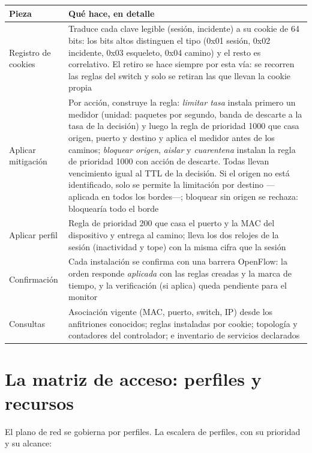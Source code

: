 \documentclass[11pt,a4paper]{article}
\begin{document}
\begin{longtable}{p{4.6cm}p{9.4cm}}
\toprule
\textbf{Pieza} & \textbf{Qué hace, en detalle}\\
\midrule
Registro de cookies & Traduce cada clave legible (sesión, incidente) a su cookie de 64 bits: los bits altos distinguen el tipo (0x01 sesión, 0x02 incidente, 0x03 esqueleto, 0x04 camino) y el resto es correlativo. El retiro se hace siempre por esta vía: se recorren las reglas del switch y solo se retiran las que llevan la cookie propia\\
Aplicar mitigación & Por acción, construye la regla: \emph{limitar tasa} instala primero un medidor (unidad: paquetes por segundo, banda de descarte a la tasa de la decisión) y luego la regla de prioridad 1000 que casa origen, puerto y destino y aplica el medidor antes de los caminos; \emph{bloquear origen}, \emph{aislar} y \emph{cuarentena} instalan la regla de prioridad 1000 con acción de descarte. Todas llevan vencimiento igual al TTL de la decisión. Si el origen no está identificado, solo se permite la limitación por destino ---aplicada en todos los bordes---; bloquear sin origen se rechaza: bloquearía todo el borde\\
Aplicar perfil & Regla de prioridad 200 que casa el puerto y la MAC del dispositivo y entrega al camino; lleva los dos relojes de la sesión (inactividad y tope) con la misma cifra que la sesión\\
Confirmación & Cada instalación se confirma con una barrera OpenFlow: la orden responde \emph{aplicada} con las reglas creadas y la marca de tiempo, y la verificación (si aplica) queda pendiente para el monitor\\
Consultas & Asociación vigente (MAC, puerto, switch, IP) desde los anfitriones conocidos; reglas instaladas por cookie; topología y contadores del controlador; e inventario de servicios declarados\\
\bottomrule
\end{longtable}

\section{La matriz de acceso: perfiles y recursos}

El plano de red se gobierna por perfiles. La escalera de perfiles, con su prioridad y su alcance:
\end{document}
